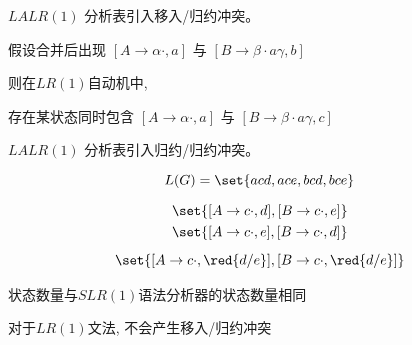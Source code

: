 \begin{frame}{}
  \begin{center}

    \pause
    \begin{theorem}
      $LALR(1)$ 分析表引入移入/归约冲突。
    \end{theorem}

    \pause
    \vspace{0.50cm}

    \vspace{0.30cm}
    假设合并后出现 $[A \to \alpha \cdot, a]$ 与 $[B \to \beta \cdot a \gamma, b]$

    \vspace{0.60cm}
    则在$LR(1)$自动机中,

    \vspace{0.20cm}
    存在某状态同时包含 $[A \to \alpha \cdot, a]$ 与 $[B \to \beta \cdot a \gamma, c]$
  \end{center}
\end{frame}

\begin{frame}{}
  \begin{center}

    \begin{theorem}
      $LALR(1)$ 分析表引入归约/归约冲突。
    \end{theorem}

    \pause
    \[
      L(G) = \set{acd, ace, bcd, bce}
    \]

    \pause
    \vspace{-0.30cm}
    \begin{gather*}
      \set{[A \to c \cdot, d], [B \to c \cdot, e]} \\
      \set{[A \to c \cdot, e], [B \to c \cdot, d]} \\[5pt]
      \set{[A \to c \cdot, \red{d/e}], [B \to c \cdot, \red{d/e}]} \\
    \end{gather*}
  \end{center}
\end{frame}

\begin{frame}{}
  \begin{center}

    \vspace{0.80cm}
    状态数量与$SLR(1)$语法分析器的状态数量相同

    \vspace{0.80cm}
    对于$LR(1)$文法, 不会产生移入/归约冲突
  \end{center}
\end{frame}

